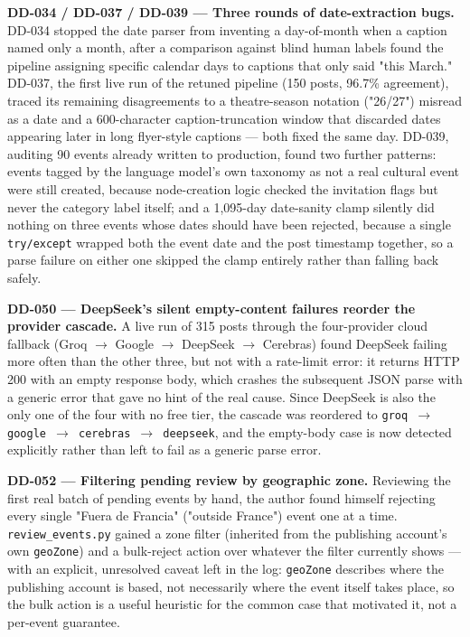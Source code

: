 \documentclass[12pt, a4paper]{report}
\begin{document}
\textbf{DD-034 / DD-037 / DD-039 --- Three rounds of date-extraction
bugs.} DD-034 stopped the date parser from inventing a day-of-month when
a caption named only a month, after a comparison against blind human
labels found the pipeline assigning specific calendar days to captions
that only said "this March." DD-037, the first live run of the retuned
pipeline (150 posts, 96.7\% agreement), traced its remaining
disagreements to a theatre-season notation ("26/27") misread as a date
and a 600-character caption-truncation window that discarded dates
appearing later in long flyer-style captions — both fixed the same day.
DD-039, auditing 90 events already written to production, found two
further patterns: events tagged by the language model's own taxonomy as
not a real cultural event were still created, because node-creation
logic checked the invitation flags but never the category label itself;
and a 1{,}095-day date-sanity clamp silently did nothing on three events
whose dates should have been rejected, because a single
\texttt{try/except} wrapped both the event date and the post timestamp
together, so a parse failure on either one skipped the clamp entirely
rather than falling back safely.

\textbf{DD-050 --- DeepSeek's silent empty-content failures reorder the
provider cascade.} A live run of 315 posts through the four-provider
cloud fallback (Groq $\to$ Google $\to$ DeepSeek $\to$ Cerebras) found
DeepSeek failing more often than the other three, but not with a
rate-limit error: it returns HTTP 200 with an empty response body,
which crashes the subsequent JSON parse with a generic error that gave
no hint of the real cause. Since DeepSeek is also the only one of the
four with no free tier, the cascade was reordered to
\texttt{groq $\to$ google $\to$ cerebras $\to$ deepseek}, and the empty-body
case is now detected explicitly rather than left to fail as a generic
parse error.

\textbf{DD-052 --- Filtering pending review by geographic zone.}
Reviewing the first real batch of pending events by hand, the author
found himself rejecting every single "Fuera de Francia" ("outside
France") event one at a time. \texttt{review\_events.py} gained a zone
filter (inherited from the publishing account's own \texttt{geoZone})
and a bulk-reject action over whatever the filter currently shows — with
an explicit, unresolved caveat left in the log: \texttt{geoZone}
describes where the publishing account is based, not necessarily where
the event itself takes place, so the bulk action is a useful heuristic
for the common case that motivated it, not a per-event guarantee.


\end{document}
